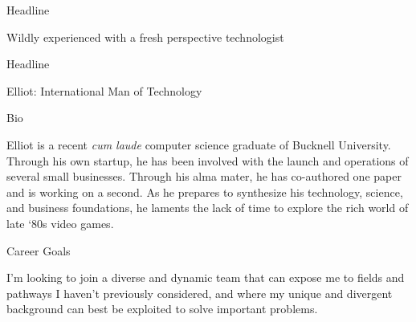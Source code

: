 \documentclass{resume} %
\begin{document}

\begin{rSection}{Headline}

Wildly experienced with a fresh perspective technologist \\

\end{rSection}

\begin{rSection}{Headline}

Elliot: International Man of Technology \\

\end{rSection}


\begin{rSection}{Bio}

Elliot is a recent \textit{cum laude} computer science graduate of Bucknell University. Through his own startup, he has been involved with the launch and operations of several small businesses. Through his alma mater, he has co-authored one paper and is working on a second. As he prepares to synthesize his technology, science, and business foundations, he laments the lack of time to explore the rich world of late ‘80s video games. \\

\end{rSection}


\begin{rSection}{Career Goals}

I'm looking to join a diverse and dynamic team that can expose me to fields and pathways I haven't previously considered, and where my unique and divergent background can best be exploited to solve important problems. \\

\end{rSection}
\end{document}
